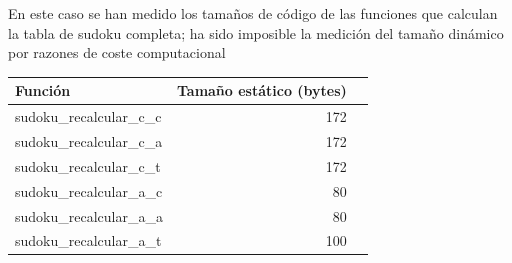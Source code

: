\documentclass[12pt,letterpaper]{article}
\begin{document}
\begin{itemize}
\begin{center}
\begin{tabular}{ l | r | r }
    \end{tabular}
  \end{center}
  En este caso se han medido los tamaños de código de las funciones
  que calculan la tabla de sudoku completa; ha sido imposible la
  medición del tamaño dinámico por razones de coste computacional
  \begin{center}
    \begin{tabular}{ l | r | r }
      Función                                   & Tamaño estático (bytes) \\ \hline
      sudoku\_recalcular\_c\_c                  & 172                       \\
      sudoku\_recalcular\_c\_a                  & 172                       \\
      sudoku\_recalcular\_c\_t \footnotemark[1] & 172                       \\
      sudoku\_recalcular\_a\_c                  & 80                        \\
      sudoku\_recalcular\_a\_a                  & 80                        \\
      sudoku\_recalcular\_a\_t                  & 100                       \\
    \end{tabular}
  \end{center}
\end{itemize}

\end{document}
